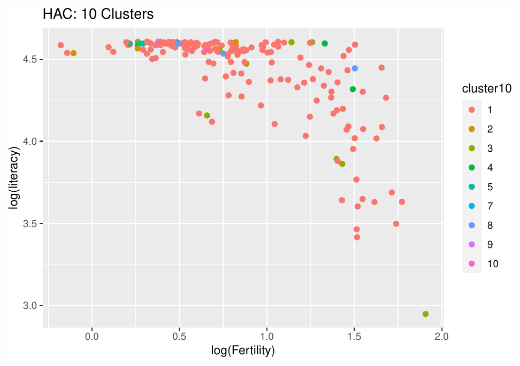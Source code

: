 \documentclass[]{article}
\begin{document}
\includegraphics{eda_files/figure-latex/unnamed-chunk-31-10.pdf}
\end{document}
